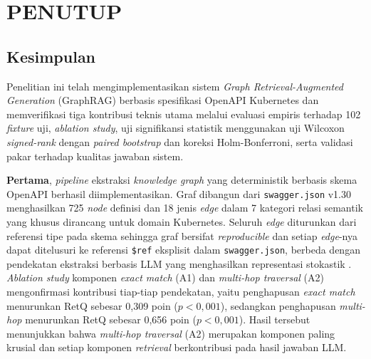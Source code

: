 \cleardoublepage
\chapter{PENUTUP}
\label{chap:penutup}

\section{Kesimpulan}

Penelitian ini telah mengimplementasikan sistem \textit{Graph Retrieval-Augmented Generation} (GraphRAG) berbasis spesifikasi OpenAPI Kubernetes dan memverifikasi tiga kontribusi teknis utama melalui evaluasi empiris terhadap 102 \textit{fixture} uji, \textit{ablation study}, uji signifikansi statistik menggunakan uji Wilcoxon \textit{signed-rank} dengan \textit{paired bootstrap} dan koreksi Holm-Bonferroni, serta validasi pakar terhadap kualitas jawaban sistem.

\textbf{Pertama}, \textit{pipeline} ekstraksi \textit{knowledge graph} yang deterministik berbasis skema OpenAPI berhasil diimplementasikan. Graf dibangun dari \texttt{swagger.json} v1.30 menghasilkan 725 \textit{node} definisi dan 18 jenis \textit{edge} dalam 7 kategori relasi semantik yang khusus dirancang untuk domain Kubernetes. Seluruh \textit{edge} diturunkan dari referensi tipe pada skema sehingga graf bersifat \textit{reproducible} dan setiap \textit{edge}-nya dapat ditelusuri ke referensi \texttt{\$ref} eksplisit dalam \texttt{swagger.json}, berbeda dengan pendekatan ekstraksi berbasis LLM yang menghasilkan representasi stokastik \parencite{pan2024unifying, wan2025empowering}. \textit{Ablation study} komponen \textit{exact match} (A1) dan \textit{multi-hop traversal} (A2) mengonfirmasi kontribusi tiap-tiap pendekatan, yaitu penghapusan \textit{exact match} menurunkan RetQ sebesar 0,309 poin ($p < 0{,}001$), sedangkan penghapusan \textit{multi-hop} menurunkan RetQ sebesar 0,656 poin ($p < 0{,}001$). Hasil tersebut menunjukkan bahwa \textit{multi-hop traversal} (A2) merupakan komponen paling krusial dan setiap komponen \textit{retrieval} berkontribusi pada hasil jawaban LLM.


